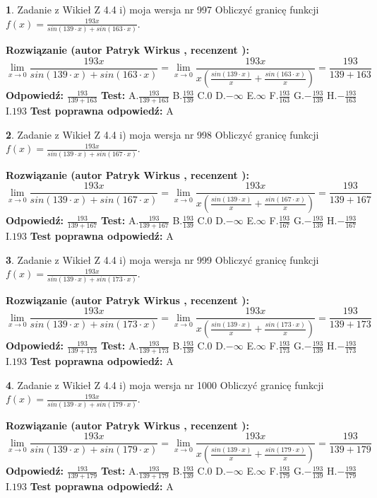 \documentclass[12pt, a4paper]{article}
\theoremstyle{definition} %
\newtheorem{zad}{}
\newcommand{\zadStart}[1]{\begin{zad}#1\newline}
\newcommand{\zadStop}{\end{zad}}
\newcommand{\rozwStart}[2]{\noindent \textbf{Rozwiązanie (autor #1 , recenzent #2): }\newline}
\newcommand{\rozwStop}{\newline}
\newcommand{\odpStart}{\noindent \textbf{Odpowiedź:}\newline}
\newcommand{\odpStop}{\newline}
\newcommand{\testStart}{\noindent \textbf{Test:}\newline}
\newcommand{\testStop}{\newline}
\newcommand{\kluczStart}{\noindent \textbf{Test poprawna odpowiedź:}\newline}
\newcommand{\kluczStop}{\newline}
\begin{document}
\zadStart{Zadanie z Wikieł Z 4.4 i) moja wersja nr 997}
Obliczyć granicę funkcji $f(x)=\frac{193x}{sin(139\cdot x) +sin(163\cdot x)}$.
\zadStop
\rozwStart{Patryk Wirkus}{}
$$\lim\limits_{x\to 0}\frac{193x}{sin(139\cdot x) +sin(163\cdot x)}=\lim\limits_{x\to 0}\frac{193x}{x(\frac{sin(139\cdot x)}{x}+\frac{sin(163\cdot x)}{x})}=\frac{193}{139+163}$$
\rozwStop
\odpStart
$\frac{193}{139+163}$
\odpStop
\testStart
A.$\frac{193}{139+163}$
B.$\frac{193}{139}$
C.$0$
D.$-\infty$
E.$\infty$
F.$\frac{193}{163}$
G.$-\frac{193}{139}$
H.$-\frac{193}{163}$
I.$193$
\testStop
\kluczStart
A
\kluczStop



\zadStart{Zadanie z Wikieł Z 4.4 i) moja wersja nr 998}
Obliczyć granicę funkcji $f(x)=\frac{193x}{sin(139\cdot x) +sin(167\cdot x)}$.
\zadStop
\rozwStart{Patryk Wirkus}{}
$$\lim\limits_{x\to 0}\frac{193x}{sin(139\cdot x) +sin(167\cdot x)}=\lim\limits_{x\to 0}\frac{193x}{x(\frac{sin(139\cdot x)}{x}+\frac{sin(167\cdot x)}{x})}=\frac{193}{139+167}$$
\rozwStop
\odpStart
$\frac{193}{139+167}$
\odpStop
\testStart
A.$\frac{193}{139+167}$
B.$\frac{193}{139}$
C.$0$
D.$-\infty$
E.$\infty$
F.$\frac{193}{167}$
G.$-\frac{193}{139}$
H.$-\frac{193}{167}$
I.$193$
\testStop
\kluczStart
A
\kluczStop



\zadStart{Zadanie z Wikieł Z 4.4 i) moja wersja nr 999}
Obliczyć granicę funkcji $f(x)=\frac{193x}{sin(139\cdot x) +sin(173\cdot x)}$.
\zadStop
\rozwStart{Patryk Wirkus}{}
$$\lim\limits_{x\to 0}\frac{193x}{sin(139\cdot x) +sin(173\cdot x)}=\lim\limits_{x\to 0}\frac{193x}{x(\frac{sin(139\cdot x)}{x}+\frac{sin(173\cdot x)}{x})}=\frac{193}{139+173}$$
\rozwStop
\odpStart
$\frac{193}{139+173}$
\odpStop
\testStart
A.$\frac{193}{139+173}$
B.$\frac{193}{139}$
C.$0$
D.$-\infty$
E.$\infty$
F.$\frac{193}{173}$
G.$-\frac{193}{139}$
H.$-\frac{193}{173}$
I.$193$
\testStop
\kluczStart
A
\kluczStop



\zadStart{Zadanie z Wikieł Z 4.4 i) moja wersja nr 1000}
Obliczyć granicę funkcji $f(x)=\frac{193x}{sin(139\cdot x) +sin(179\cdot x)}$.
\zadStop
\rozwStart{Patryk Wirkus}{}
$$\lim\limits_{x\to 0}\frac{193x}{sin(139\cdot x) +sin(179\cdot x)}=\lim\limits_{x\to 0}\frac{193x}{x(\frac{sin(139\cdot x)}{x}+\frac{sin(179\cdot x)}{x})}=\frac{193}{139+179}$$
\rozwStop
\odpStart
$\frac{193}{139+179}$
\odpStop
\testStart
A.$\frac{193}{139+179}$
B.$\frac{193}{139}$
C.$0$
D.$-\infty$
E.$\infty$
F.$\frac{193}{179}$
G.$-\frac{193}{139}$
H.$-\frac{193}{179}$
I.$193$
\testStop
\kluczStart
A
\kluczStop
\end{document}
